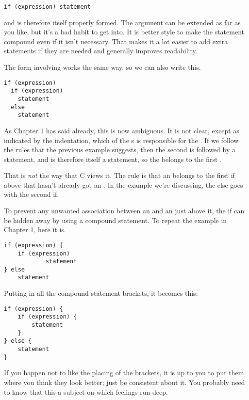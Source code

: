    \begin{Verbatim}
if (expression) statement
\end{Verbatim}

   and is therefore itself properly formed. The argument can be extended as
    far as you like, but it's a bad habit to get into. It is better style to
    make the statement compound even if it isn't necessary. That makes it a
    lot easier to add extra statements if they are needed and generally
    improves readability.


   The form involving \kelse{} works the same way, so we can also
    write this.


   \begin{Verbatim}
if (expression)
  if (expression)
    statement
  else
    statement
\end{Verbatim}

   As Chapter 1 has said already, this is now ambiguous. It is
    not clear, except as indicated by the indentation, which of the
    \kif{}s is responsible for the \kelse. If we follow
    the rules that the previous example suggests, then the second
    \kif{} is followed by a statement, and is therefore itself a
    statement, so the \kelse{} belongs to the first
    \kif.


   That is \textit{not} the way that C views it. The rule is that an
    \kelse{} belongs to the first if above that hasn't already got an
    \kelse. In the example we're discussing, the else goes with the
    second if.


   To prevent any unwanted association between an \kelse{} and an
    \kif{} just above it, the if can be hidden away by using a
    compound statement. To repeat the example in Chapter 1, here
    it is.


   \begin{Verbatim}
if (expression) {
    if (expression)
            statement
} else
    statement
\end{Verbatim}

   Putting in all the compound statement brackets, it becomes this:


   \begin{Verbatim}
if (expression) {
    if (expression) {
        statement
    }
} else {
    statement
}
\end{Verbatim}

   If you happen not to like the placing of the brackets, it is up to you
    to put them where you think they look better; just be consistent about it.
    You probably need to know that this a subject on which feelings run
    deep.



